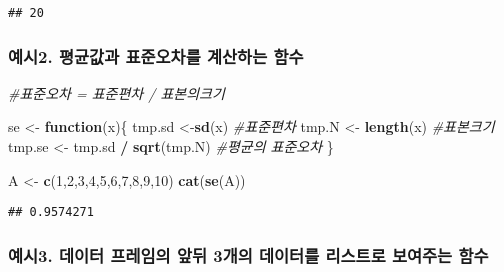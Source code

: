 \documentclass[
]{article}
\newenvironment{Shaded}{\begin{snugshade}}{\end{snugshade}}
\newcommand{\CommentTok}[1]{\textcolor[rgb]{0.56,0.35,0.01}{\textit{#1}}}
\newcommand{\ControlFlowTok}[1]{\textcolor[rgb]{0.13,0.29,0.53}{\textbf{#1}}}
\newcommand{\DecValTok}[1]{\textcolor[rgb]{0.00,0.00,0.81}{#1}}
\newcommand{\KeywordTok}[1]{\textcolor[rgb]{0.13,0.29,0.53}{\textbf{#1}}}
\newcommand{\NormalTok}[1]{#1}
\newcommand{\OperatorTok}[1]{\textcolor[rgb]{0.81,0.36,0.00}{\textbf{#1}}}
\newcommand{\StringTok}[1]{\textcolor[rgb]{0.31,0.60,0.02}{#1}}
\begin{document}
\begin{verbatim}
## 20
\end{verbatim}

\hypertarget{uxc608uxc2dc2.-uxd3c9uxade0uxac12uxacfc-uxd45cuxc900uxc624uxcc28uxb97c-uxacc4uxc0b0uxd558uxb294-uxd568uxc218}{%
\subsubsection{예시2. 평균값과 표준오차를 계산하는
함수}\label{uxc608uxc2dc2.-uxd3c9uxade0uxac12uxacfc-uxd45cuxc900uxc624uxcc28uxb97c-uxacc4uxc0b0uxd558uxb294-uxd568uxc218}}

\begin{Shaded}
\begin{Highlighting}[]
\CommentTok{#표준오차 = 표준편차 / 표본의크기}

\NormalTok{se <-}\StringTok{ }\ControlFlowTok{function}\NormalTok{(x)\{}
\NormalTok{  tmp.sd <-}\KeywordTok{sd}\NormalTok{(x) }\CommentTok{#표준편차}
\NormalTok{  tmp.N <-}\StringTok{ }\KeywordTok{length}\NormalTok{(x) }\CommentTok{#표본크기}
\NormalTok{  tmp.se <-}\StringTok{ }\NormalTok{tmp.sd }\OperatorTok{/}\StringTok{ }\KeywordTok{sqrt}\NormalTok{(tmp.N) }\CommentTok{#평균의 표준오차}
\NormalTok{\}}

\NormalTok{A <-}\StringTok{ }\KeywordTok{c}\NormalTok{(}\DecValTok{1}\NormalTok{,}\DecValTok{2}\NormalTok{,}\DecValTok{3}\NormalTok{,}\DecValTok{4}\NormalTok{,}\DecValTok{5}\NormalTok{,}\DecValTok{6}\NormalTok{,}\DecValTok{7}\NormalTok{,}\DecValTok{8}\NormalTok{,}\DecValTok{9}\NormalTok{,}\DecValTok{10}\NormalTok{)}
\KeywordTok{cat}\NormalTok{(}\KeywordTok{se}\NormalTok{(A))}
\end{Highlighting}
\end{Shaded}

\begin{verbatim}
## 0.9574271
\end{verbatim}

\hypertarget{uxc608uxc2dc3.-uxb370uxc774uxd130-uxd504uxb808uxc784uxc758-uxc55euxb4a4-3uxac1cuxc758-uxb370uxc774uxd130uxb97c-uxb9acuxc2a4uxd2b8uxb85c-uxbcf4uxc5ecuxc8fcuxb294-uxd568uxc218}{%
\subsubsection{예시3. 데이터 프레임의 앞뒤 3개의 데이터를 리스트로
보여주는
함수}\label{uxc608uxc2dc3.-uxb370uxc774uxd130-uxd504uxb808uxc784uxc758-uxc55euxb4a4-3uxac1cuxc758-uxb370uxc774uxd130uxb97c-uxb9acuxc2a4uxd2b8uxb85c-uxbcf4uxc5ecuxc8fcuxb294-uxd568uxc218}}
\end{document}
